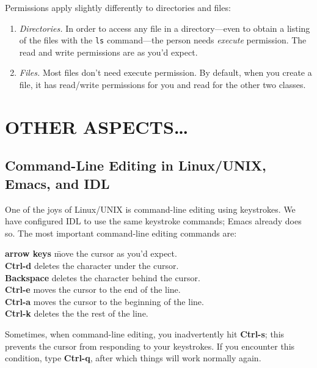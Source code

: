 \documentclass[psfig,preprint]{aastex}
\begin{document}
Permissions apply slightly differently to directories and files: \begin{enumerate} 

\item {\it Directories.} In order to access any file in a
  directory---even to obtain a listing of the files with the {\tt ls}
  command---the person needs {\it execute} permission. The read and
  write permissions are as you'd expect.

\item {\it Files.} Most files don't need execute permission. By
  default, when you create a file, it has read/write permissions for you
  and read for the other two classes.

\end{enumerate}

\section{OTHER ASPECTS\dots}


\subsection{Command-Line Editing in Linux/UNIX, Emacs, and IDL}

\label{keycommands}

One of the joys of Linux/UNIX is command-line editing using keystrokes. We have
configured IDL to use the same keystroke commands; Emacs already does so.
The most important command-line editing commands are:

\begin {tabbing}
{\bf arrow keys} \hspace{0.8in} \= move the cursor as you'd expect. \\
{\bf Ctrl-d} \> deletes the character under the cursor. \\
{\bf Backspace} \> deletes the character behind the cursor. \\
{\bf Ctrl-e} \> moves the cursor to the end of the line. \\
{\bf Ctrl-a} \> moves the cursor to the beginning of the line. \\
{\bf Ctrl-k} \> deletes the the rest of the line.
\end{tabbing}

\noindent Sometimes, when command-line editing, you inadvertently hit
{\bf Ctrl-s}; this prevents the cursor from responding to your
keystrokes. If you encounter this condition, type {\bf Ctrl-q}, after
which things will work normally again.
\end{document}
